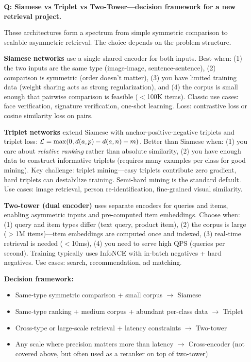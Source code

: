 \begin{interviewq}
\textbf{Q: Siamese vs Triplet vs Two-Tower---decision framework for a new retrieval project.}

 \quad {} \quad \badgefreq{\freqhigh}

\stronganswer

These architectures form a spectrum from simple symmetric comparison to scalable asymmetric retrieval. The choice depends on the problem structure.

\textbf{Siamese networks} use a single shared encoder for both inputs. Best when: (1) the two inputs are the same type (image-image, sentence-sentence), (2) comparison is symmetric (order doesn't matter), (3) you have limited training data (weight sharing acts as strong regularization), and (4) the corpus is small enough that pairwise comparison is feasible ($<$100K items). Classic use cases: face verification, signature verification, one-shot learning. Loss: contrastive loss or cosine similarity loss on pairs.

\textbf{Triplet networks} extend Siamese with anchor-positive-negative triplets and triplet loss: $\mathcal{L} = \max(0, d(a,p) - d(a,n) + m)$. Better than Siamese when: (1) you care about \textit{relative ranking} rather than absolute similarity, (2) you have enough data to construct informative triplets (requires many examples per class for good mining). Key challenge: triplet mining---easy triplets contribute zero gradient, hard triplets can destabilize training. Semi-hard mining is the standard default. Use cases: image retrieval, person re-identification, fine-grained visual similarity.

\textbf{Two-tower (dual encoder)} uses separate encoders for queries and items, enabling asymmetric inputs and pre-computed item embeddings. Choose when: (1) query and item types differ (text query, product item), (2) the corpus is large ($>$1M items)---item embeddings are computed once and indexed, (3) real-time retrieval is needed ($<$10ms), (4) you need to serve high QPS (queries per second). Training typically uses InfoNCE with in-batch negatives + hard negatives. Use cases: search, recommendation, ad matching.

\textbf{Decision framework:}
\begin{itemize}
    \item Same-type symmetric comparison + small corpus $\to$ Siamese
    \item Same-type ranking + medium corpus + abundant per-class data $\to$ Triplet
    \item Cross-type or large-scale retrieval + latency constraints $\to$ Two-tower
    \item Any scale where precision matters more than latency $\to$ Cross-encoder (not covered above, but often used as a reranker on top of two-tower)
\end{itemize}


\end{interviewq}

